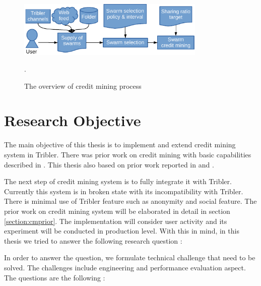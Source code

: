 \begin{figure}[ht]
	\centering
	\includegraphics[width=0.8\textwidth]{pics/creditmining2015.pdf}
	\caption{The overview of credit mining process \cite{2015:creditmining:capota}}.
	\label{fig:cm15}
\end{figure}

\section{Research Objective}
The main objective of this thesis is to implement and extend credit mining system in Tribler. There was prior work on credit mining with basic capabilities described in \cite{2015:creditmining:capota}. This thesis also based on prior work reported in  \cite{2013:investmentcm:capota} and  \cite{2014:bwmarket:capota}. 

The next step of credit mining system is to fully integrate it with Tribler. Currently this system is in broken state with its incompatibility with Tribler. There is minimal use of Tribler feature such as anonymity and social feature. The prior work on credit mining system will be elaborated in detail in section \ref{section:cmprior}. The implementation will consider user activity and its experiment will be conducted in production level. With this in mind, in this thesis we tried to answer the following research question : 


In order to answer the question, we formulate technical challenge that need to be solved. The challenges include engineering and performance evaluation aspect. The questions are the following : 

